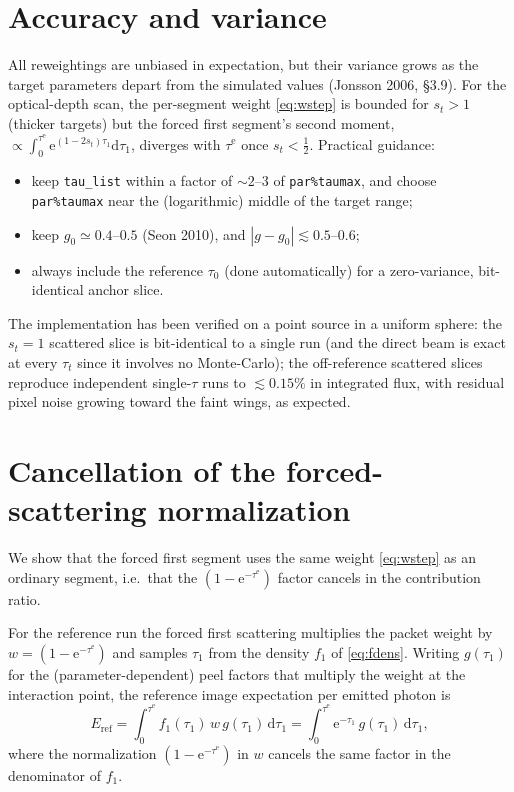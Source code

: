 \documentclass[english,a4paper]{kiseon_memo}
\newcommand{\rd}{\mathrm{d}}
\newcommand{\ee}{\mathrm{e}}
\newcommand{\edg}{\mathrm{e}}
\newcommand{\half}{\tfrac{1}{2}}
\begin{document}
\section{Accuracy and variance}

All reweightings are unbiased in expectation, but their variance grows as the
target parameters depart from the simulated values (Jonsson 2006, \S3.9).  For
the optical-depth scan, the per-segment weight \eqref{eq:wstep} is bounded for
$s_t>1$ (thicker targets) but the forced first segment's second moment,
$\propto\!\int_0^{\tau^{\edg}}\!\ee^{(1-2s_t)\tau_1}\rd\tau_1$, diverges with
$\tau^{\edg}$ once $s_t<\half$.  Practical guidance:
\begin{itemize}
\item keep \texttt{tau\_list} within a factor of $\sim2$--$3$ of
  \texttt{par\%taumax}, and choose \texttt{par\%taumax} near the (logarithmic)
  middle of the target range;
\item keep $g_0\simeq0.4$--$0.5$ (Seon 2010), and $|g-g_0|\lesssim0.5$--$0.6$;
\item always include the reference $\tau_0$ (done automatically) for a
  zero-variance, bit-identical anchor slice.
\end{itemize}

The implementation has been verified on a point source in a uniform sphere:
the $s_t=1$ scattered slice is bit-identical to a single run (and the direct
beam is exact at every $\tau_t$ since it involves no Monte-Carlo); the
off-reference scattered slices reproduce independent single-$\tau$ runs to
$\lesssim0.15\%$ in integrated flux, with residual pixel noise growing toward the
faint wings, as expected.

\appendix
\section{Cancellation of the forced-scattering normalization}
\label{app:forced}

We show that the forced first segment uses the same weight \eqref{eq:wstep} as an
ordinary segment, i.e.\ that the $(1-\ee^{-\tau^{\edg}})$ factor cancels in the
contribution ratio.

For the reference run the forced first scattering multiplies the packet weight by
$w=(1-\ee^{-\tau^{\edg}})$ and samples $\tau_1$ from the density $f_1$ of
\eqref{eq:fdens}.  Writing $g(\tau_1)$ for the (parameter-dependent) peel factors
that multiply the weight at the interaction point, the reference image
expectation per emitted photon is
\begin{equation}
  E_{\mathrm{ref}}
  = \int_0^{\tau^{\edg}}\! f_1(\tau_1)\,w\,g(\tau_1)\,\rd\tau_1
  = \int_0^{\tau^{\edg}}\! \ee^{-\tau_1}\,g(\tau_1)\,\rd\tau_1 ,
\end{equation}
where the normalization $(1-\ee^{-\tau^{\edg}})$ in $w$ cancels the same factor in
the denominator of $f_1$.
\end{document}
